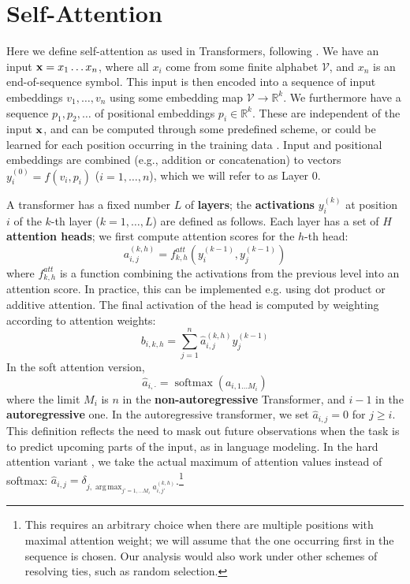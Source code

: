 \documentclass[11pt,a4paper]{article}
\DeclareMathOperator*{\argmax}{arg\,max}
\newcommand{\key}[1]{\textbf{#1}}
\begin{document}
\section{Self-Attention}\label{sec:def-selfatt}
Here we define self-attention as used in Transformers, following \citet{vaswani2017attention}.
We have an input ${\bf x} = x_1 \dots x_n$, where all $x_i$ come from some finite alphabet $\mathcal{V}$, and $x_n$ is an end-of-sequence symbol.
This input is then encoded into a sequence of input embeddings $v_1,\dots,v_n$ using some embedding map $\mathcal{V} \rightarrow \mathbb{R}^k$. %
We furthermore have a sequence $p_1, p_2, \dots$ of positional embeddings $p_i \in \mathbb{R}^k$. These are independent of the input ${\bf x}$, and can be computed through some predefined scheme, or could be learned for each position occurring in the training data \citep{vaswani2017attention}.
Input and positional embeddings are combined (e.g., addition or concatenation) to vectors $y_i^{(0)} = f(v_i, p_i)$ ($i=1, \dots, n$), which we will refer to as Layer 0.

A transformer has a fixed number $L$ of \key{layers}; the \key{activations} $y_i^{(k)}$ at position $i$ of the $k$-th layer ($k=1, \dots, L$) are defined as follows.
Each layer has a set of $H$ \key{attention heads}; we first compute attention scores for the $h$-th head:
\begin{equation}
    a_{i,j}^{(k,h)} = f^{att}_{k,h}\left(y_i^{(k-1)}, y_j^{(k-1)}\right)
\end{equation}
where $f^{att}_{k,h}$ is a function combining the activations from the previous level into an attention score.
In practice, this can be implemented e.g. using dot product or additive attention.
The final activation of the head is computed by weighting according to attention weights:
\begin{equation}
    b_{i,k,h} = \sum_{j=1}^n \hat{a}_{i,j}^{(k,h)} y_j^{(k-1)}
\end{equation}
In the soft attention version,
$$ \hat{a}_{i,\cdot} = \operatorname{softmax}(a_{i,1\dots M_i}) $$
where the limit $M_i$ is $n$ in the \key{non-autoregressive} Transformer, and $i-1$ in the \key{autoregressive} one.
In the autoregressive transformer, we set $\hat{a}_{i,j} = 0$ for $j \geq i$.
This definition reflects the need to mask out future observations when the task is to predict upcoming parts of the input, as in language modeling.
In the hard attention variant \cite{perez2019turing}, we take the actual maximum of attention values instead of softmax:
$\hat{a}_{i,j} = \delta_{j, \argmax_{j' = 1, \dots M_i} a_{i,j'}^{(k,h)}}$.\footnote{This requires an arbitrary choice when there are multiple positions with maximal attention weight; we will assume that the one occurring first in the sequence is chosen. Our analysis would also work under other schemes of resolving ties, such as random selection.}
\end{document}
